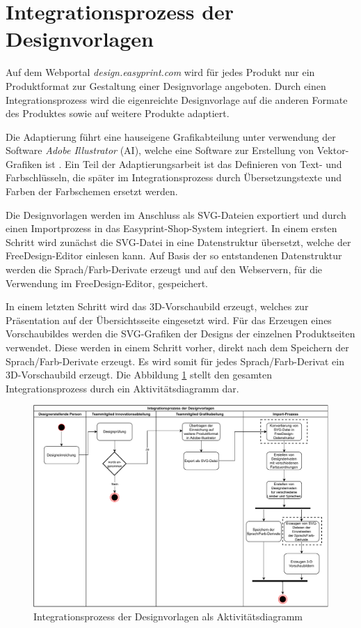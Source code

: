 \section{Integrationsprozess der Designvorlagen}
\label{sect:Integrationsprozess_Designvorlagen}
Auf dem Webportal \emph{design.easyprint.com} wird für jedes Produkt nur ein Produktformat zur Gestaltung einer Designvorlage angeboten. Durch einen Integrationsprozess wird die eigenreichte Designvorlage auf die anderen Formate des Produktes sowie auf weitere Produkte adaptiert.

Die Adaptierung führt eine hauseigene Grafikabteilung unter verwendung der Software \emph{Adobe Illustrator} (AI), welche eine Software zur Erstellung von Vektor-Grafiken ist \autocite[vgl.][]{Adobe:Illustrator}. 
Ein Teil der Adaptierungsarbeit ist das Definieren von Text- und Farbschlüsseln, die später im Integrationsprozess durch Übersetzungstexte und Farben der Farbschemen ersetzt werden. 

Die Designvorlagen werden im Anschluss als SVG-Dateien exportiert und durch einen Importprozess in das Easyprint-Shop-System integriert. 
In einem ersten Schritt wird zunächst die SVG-Datei in eine Datenstruktur übersetzt, welche der FreeDesign-Editor einlesen kann. Auf Basis der so entstandenen  
Datenstruktur werden die Sprach/Farb-Derivate erzeugt und auf den Webservern, für die Verwendung im FreeDesign-Editor, gespeichert.  

In einem letzten Schritt wird das 3D-Vorschaubild erzeugt, welches zur Präsentation auf der Übersichtsseite eingesetzt wird. Für das Erzeugen eines Vorschaubildes werden die SVG-Grafiken der Designs der einzelnen Produktseiten verwendet. 
Diese werden in einem Schritt vorher, direkt nach dem Speichern der Sprach/Farb-Derivate erzeugt. Es wird somit für jedes Sprach/Farb-Derivat ein 3D-Vorschaubild erzeugt.
Die Abbildung \ref{fig:Vorlagenimport} stellt den gesamten Integrationsprozess durch ein Aktivitätsdiagramm dar.

\begin{figure}[H]
    \centering
    \includegraphics[width=.98\textwidth]{diagrams/FreeDesign-Vorlagenerstellung.pdf}
\caption{Integrationsprozess der Designvorlagen als Aktivitätsdiagramm}
\label{fig:Vorlagenimport}
\end{figure}

